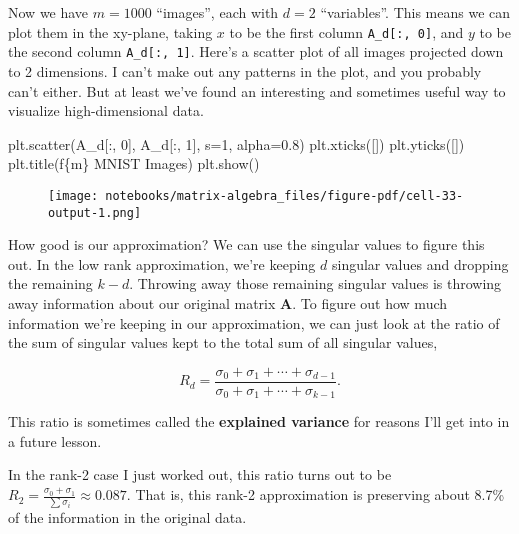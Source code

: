 \documentclass[
  letterpaper,
  DIV=11,
  numbers=noendperiod]{scrreprt}
\newenvironment{Shaded}{\begin{snugshade}}{\end{snugshade}}
\newcommand{\DecValTok}[1]{\textcolor[rgb]{0.68,0.00,0.00}{#1}}
\newcommand{\FloatTok}[1]{\textcolor[rgb]{0.68,0.00,0.00}{#1}}
\newcommand{\NormalTok}[1]{\textcolor[rgb]{0.00,0.23,0.31}{#1}}
\newcommand{\OperatorTok}[1]{\textcolor[rgb]{0.37,0.37,0.37}{#1}}
\newcommand{\SpecialCharTok}[1]{\textcolor[rgb]{0.37,0.37,0.37}{#1}}
\newcommand{\SpecialStringTok}[1]{\textcolor[rgb]{0.13,0.47,0.30}{#1}}
\begin{document}
Now we have \(m=1000\) ``images'', each with \(d=2\) ``variables''. This
means we can plot them in the xy-plane, taking \(x\) to be the first
column \texttt{A\_d{[}:,\ 0{]}}, and \(y\) to be the second column
\texttt{A\_d{[}:,\ 1{]}}. Here's a scatter plot of all images projected
down to 2 dimensions. I can't make out any patterns in the plot, and you
probably can't either. But at least we've found an interesting and
sometimes useful way to visualize high-dimensional data.

\begin{Shaded}
\begin{Highlighting}[]
\NormalTok{plt.scatter(A\_d[:, }\DecValTok{0}\NormalTok{], A\_d[:, }\DecValTok{1}\NormalTok{], s}\OperatorTok{=}\DecValTok{1}\NormalTok{, alpha}\OperatorTok{=}\FloatTok{0.8}\NormalTok{)}
\NormalTok{plt.xticks([])}
\NormalTok{plt.yticks([])}
\NormalTok{plt.title(}\SpecialStringTok{f\textquotesingle{}}\SpecialCharTok{\{}\NormalTok{m}\SpecialCharTok{\}}\SpecialStringTok{ MNIST Images\textquotesingle{}}\NormalTok{)}
\NormalTok{plt.show()}
\end{Highlighting}
\end{Shaded}

\begin{figure}[H]

{\centering \texttt{[image: notebooks/matrix-algebra\_files/figure-pdf/cell-33-output-1.png]}

}

\end{figure}

How good is our approximation? We can use the singular values to figure
this out. In the low rank approximation, we're keeping \(d\) singular
values and dropping the remaining \(k-d\). Throwing away those remaining
singular values is throwing away information about our original matrix
\(\mathbf{A}\). To figure out how much information we're keeping in our
approximation, we can just look at the ratio of the sum of singular
values kept to the total sum of all singular values,

\[R_d = \frac{\sigma_0 + \sigma_1 + \cdots + \sigma_{d-1}}{\sigma_0 + \sigma_1 + \cdots + \sigma_{k-1}}.\]

This ratio is sometimes called the \textbf{explained variance} for
reasons I'll get into in a future lesson.

In the rank-2 case I just worked out, this ratio turns out to be
\(R_2 = \frac{\sigma_0 + \sigma_1}{\sum \sigma_i} \approx 0.087\). That
is, this rank-2 approximation is preserving about 8.7\% of the
information in the original data.
\end{document}
